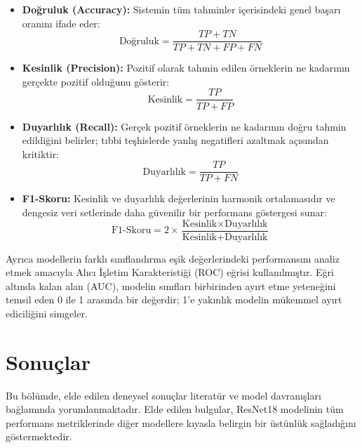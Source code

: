 \documentclass[conference]{IEEEtran}
\begin{document}
\begin{itemize}
    \item \textbf{Doğruluk (Accuracy):} Sistemin tüm tahminler içerisindeki genel başarı oranını ifade eder:
    \begin{equation}
        \text{Doğruluk} = \frac{TP + TN}{TP + TN + FP + FN}
    \end{equation}

    \item \textbf{Kesinlik (Precision):} Pozitif olarak tahmin edilen örneklerin ne kadarının gerçekte pozitif olduğunu gösterir:
    \begin{equation}
        \text{Kesinlik} = \frac{TP}{TP + FP}
    \end{equation}

    \item \textbf{Duyarlılık (Recall):} Gerçek pozitif örneklerin ne kadarının doğru tahmin edildiğini belirler; tıbbi teşhislerde yanlış negatifleri azaltmak açısından kritiktir:
    \begin{equation}
        \text{Duyarlılık} = \frac{TP}{TP + FN}
    \end{equation}

    \item \textbf{F1-Skoru:} Kesinlik ve duyarlılık değerlerinin harmonik ortalamasıdır ve dengesiz veri setlerinde daha güvenilir bir performans göstergesi sunar:
    \begin{equation}
        \text{F1-Skoru} = 2 \times \frac{\text{Kesinlik} \times \text{Duyarlılık}}{\text{Kesinlik} + \text{Duyarlılık}}
    \end{equation}
\end{itemize}

Ayrıca modellerin farklı sınıflandırma eşik değerlerindeki performansını analiz etmek amacıyla Alıcı İşletim Karakteristiği (ROC) eğrisi kullanılmıştır. Eğri altında kalan alan (AUC), modelin sınıfları birbirinden ayırt etme yeteneğini temsil eden 0 ile 1 arasında bir değerdir; 1'e yakınlık modelin mükemmel ayırt ediciliğini simgeler.

\section{Sonuçlar}
Bu bölümde, elde edilen deneysel sonuçlar literatür ve model davranışları bağlamında yorumlanmaktadır. Elde edilen bulgular, ResNet18 modelinin tüm performans metriklerinde diğer modellere kıyasla belirgin bir üstünlük sağladığını göstermektedir. 
\end{document}
